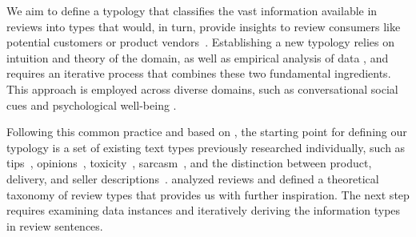 We aim to define a typology that classifies the vast information available in reviews into types that would, in turn, provide insights to review consumers like potential customers or product vendors~\citep{Rohrdantz2016review_insights}.
Establishing a new typology relies on intuition and theory of the domain, as well as empirical analysis of data \citep{Nickerson2013taxonomydevelop}, and requires an iterative process that combines these two fundamental ingredients. This approach is employed across diverse domains, such as conversational social cues \citep[e.g.,][]{Feine2019conversationTaxonomy} and psychological well-being \citep[e.g.,][]{Desmet2020psychoTypology}.

Following this common practice and based on \citet{Nickerson2013taxonomydevelop}, the starting point for defining our typology is a set of existing text types previously researched individually, such as tips~\citep{hirsch2021producttips}, opinions~\citep{vinodhini2012opinionmining}, toxicity~\citep{Djuric2015hatespeech}, sarcasm~\citep{aditya2017sarcasm}, and the distinction between product, delivery, and seller descriptions~\citep{Bhattacharya2020seller_delivery_classification}.
\citet{Rohrdantz2016review_insights} analyzed reviews and defined a theoretical taxonomy of review types that provides us with further inspiration. The next step requires examining data instances and iteratively deriving the information types in review sentences.

